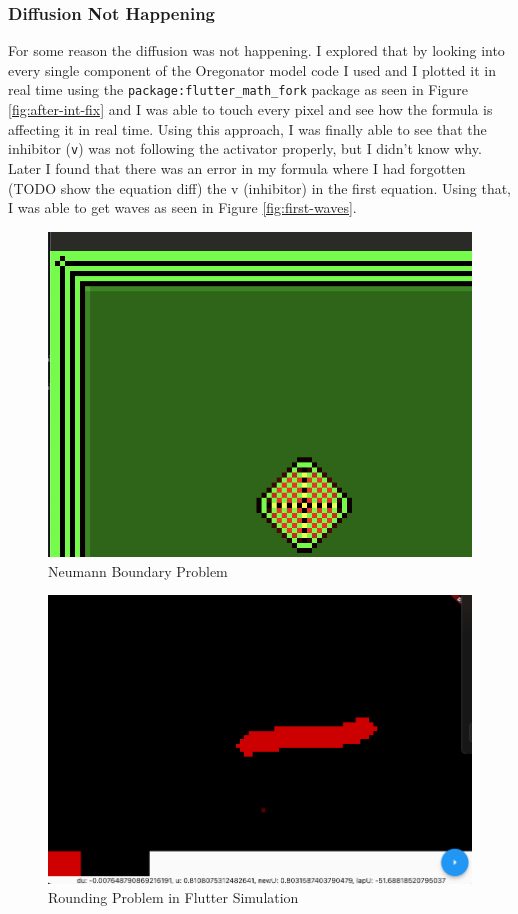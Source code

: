 \subsubsection{Diffusion Not Happening}
For some reason the diffusion was not happening. I explored that by looking into every single component of the Oregonator model code I used and I plotted it in real time using the \verb|package:flutter_math_fork| package as seen in Figure \ref{fig:after-int-fix} and I was able to touch every pixel and see how the formula is affecting it in real time. Using this approach, I was finally able to see that the inhibitor (\verb|v|) was not following the activator properly, but I didn't know why. 
Later I found that there was an error in my formula where I had forgotten (TODO show the equation diff) the v (inhibitor) in the first equation. Using that, I was able to get waves as seen in Figure \ref{fig:first-waves}.


\begin{figure}
    \centering
    \includegraphics[width=0.5\linewidth]{neumann.png}
    \caption{Neumann Boundary Problem}
    \label{fig:neumann-bondary}
\end{figure}

\begin{figure}
    \centering
    \includegraphics[width=0.5\linewidth]{int8.png}
    \caption{Rounding Problem in Flutter Simulation}
    \label{fig:rounding-problem}
\end{figure}

